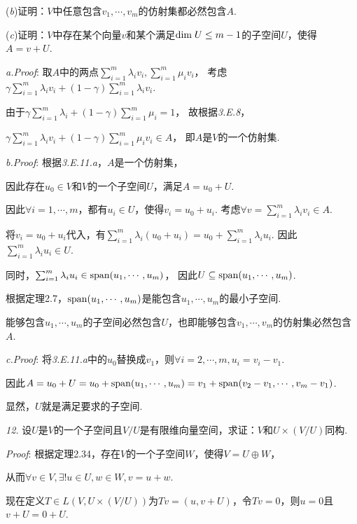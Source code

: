 (\textit{b})证明：\(V\)中任意包含\(v_1,\cdots,v_m\)的仿射集都必然包含\(A\).

(\textit{c})证明：\(V\)中存在某个向量\(v\)和某个满足\(\mathrm{dim \;} U \leq m-1\)的子空间\(U\)，使得\(A=v+U\).

\textit{a.Proof}:
取\(A\)中的两点\(\sum_{i=1}^m \lambda_i v_i,\sum_{i=1}^m \mu_i v_i\)，
考虑\(\gamma \sum_{i=1}^m \lambda_i v_i+(1-\gamma)\sum_{i=1}^m \lambda_i v_i\).

由于\(\gamma \sum_{i=1}^m \lambda_i+(1-\gamma)\sum_{i=1}^m \mu_i=1\)，
故根据\textit{3.E.8}，

\(\gamma \sum_{i=1}^m \lambda_i v_i+(1-\gamma)\sum_{i=1}^m \mu_i v_i \in A\)，
即\(A\)是\(V\)的一个仿射集.

\textit{b.Proof}:
根据\textit{3.E.11.a}，\(A\)是一个仿射集，

因此存在\(u_0 \in V\)和\(V\)的一个子空间\(U\)，满足\(A=u_0+U\).

因此\(\forall i=1,\cdots,m\)，都有\(u_i \in U\)，使得\(v_i=u_0+u_i\).
考虑\(\forall v=\sum_{i=1}^m \lambda_i v_i \in A\).

将\(v_i=u_0+u_i\)代入，有\(\sum_{i=1}^m \lambda_i(u_0+u_i)=u_0+\sum_{i=1}^m \lambda_i u_i\).
因此\(\sum_{i=1}^m \lambda_i u_i \in U\).

同时，\(\sum_{i=1}^m \lambda_i u_i \in \mathrm{span} (u_1,\cdots,u_m)\)，
因此\(U \subseteq \mathrm{span} (u_1,\cdots,u_m)\).

根据定理2.7，\(\mathrm{span} (u_1,\cdots,u_m)\)是能包含\(u_1,\cdots,u_m\)的最小子空间.

能够包含\(u_1,\cdots,u_m\)的子空间必然包含\(U\)，也即能够包含\(v_1,\cdots,v_m\)的仿射集必然包含\(A\).

\textit{c.Proof}:
将\textit{3.E.11.a}中的\(u_0\)替换成\(v_1\)，则\(\forall i=2,\cdots,m,u_i=v_i-v_1\).

因此\(A=u_0+U=u_0+\mathrm{span} (u_1,\cdots,u_m)=v_1+\mathrm{span} (v_2-v_1,\cdots,v_m-v_1)\).

显然，\(U\)就是满足要求的子空间.

\hspace*{\fill}

\textit{12.}
设\(U\)是\(V\)的一个子空间且\(V/U\)是有限维向量空间，求证：\(V\)和\(U \times (V/U)\)同构.

\textit{Proof}:
根据定理2.34，存在\(V\)的一个子空间\(W\)，使得\(V=U \oplus W\)，

从而\(\forall v \in V, \exists! u \in U,w \in W,v=u+w\).

现在定义\(T \in L(V,U \times (V/U))\)为\(Tv=(u,v+U)\)，令\(Tv=0\)，则\(u=0\)且\(v+U=0+U\).


